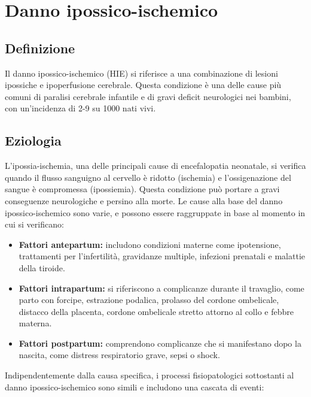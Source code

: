 \section{Danno ipossico-ischemico}

\subsection{Definizione}
Il danno ipossico-ischemico (HIE) si riferisce a una combinazione di lesioni ipossiche e ipoperfusione cerebrale. Questa condizione è una delle cause più comuni di paralisi cerebrale infantile e di gravi deficit neurologici nei bambini, con un'incidenza di 2-9 su 1000 nati vivi.

\subsection{Eziologia}
L'ipossia-ischemia, una delle principali cause di encefalopatia neonatale, si verifica quando il flusso sanguigno al cervello è ridotto (ischemia) e l'ossigenazione del sangue è compromessa (ipossiemia). Questa condizione può portare a gravi conseguenze neurologiche e persino alla morte.
Le cause alla base del danno ipossico-ischemico sono varie, e possono essere raggruppate in base al momento in cui si verificano:

\begin{itemize}
	\tightlist
	\item
	\textbf{Fattori antepartum:} includono condizioni materne come ipotensione, trattamenti per l'infertilità, gravidanze multiple, infezioni prenatali e malattie della tiroide.
	\item
	\textbf{Fattori intrapartum:} si riferiscono a complicanze durante il travaglio, come parto con forcipe, estrazione podalica, prolasso del cordone ombelicale, distacco della placenta, cordone ombelicale stretto attorno al collo e febbre materna.
	\item
	\textbf{Fattori postpartum:} comprendono complicanze che si manifestano dopo la nascita, come distress respiratorio grave, sepsi o shock.
\end{itemize}

Indipendentemente dalla causa specifica, i processi fisiopatologici sottostanti al danno ipossico-ischemico sono simili e includono una cascata di eventi:


